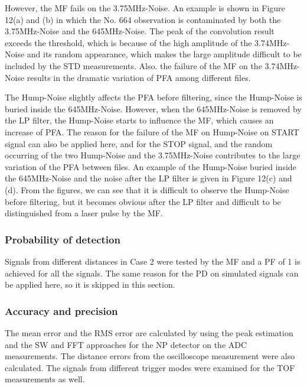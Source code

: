 However, the MF fails on the 3.75MHz-Noise. An example is shown in Figure 12(a) and (b) in which the No. 664 observation is contaminated by both the 3.75MHz-Noise and the 645MHz-Noise. The peak of the convolution result exceeds the threshold, which is because of the high amplitude of the 3.74MHz-Noise and its random appearance, which makes the large amplitude difficult to be included by the STD measurements. Also. the failure of the MF on the 3.74MHz-Noise results in the dramatic variation of PFA among different files.\par
The Hump-Noise slightly affects the PFA before filtering, since the Hump-Noise is buried inside the 645MHz-Noise. However, when the 645MHz-Noise is removed by the LP filter, the Hump-Noise starts to influence the MF, which causes an increase of PFA. The reason for the failure of the MF on Hump-Noise on START signal can also be applied here, and for the STOP signal, and the random occurring of the two Hump-Noise and the 3.75MHz-Noise contributes to the large variation of the PFA between files. An example of the Hump-Noise buried inside the 645MHz-Noise and the noise after the LP filter is given in Figure 12(c) and (d). From the figures, we can see that it is difficult to observe the Hump-Noise before filtering, but it becomes obvious after the LP filter and difficult to be distinguished from a laser pulse by the MF. 
\subsubsection{Probability of detection}
Signals from different distances in Case 2 were tested by the MF and a PF of 1 is achieved for all the signals. The same reason for the PD on simulated signals can be applied here, so it is skipped in this section.
\subsubsection{Accuracy and precision}
The mean error and the RMS error are calculated by using the peak estimation and the SW and FFT approaches for the NP detector on the ADC measurements. The distance errors from the oscilloscope measurement were also calculated. The signals from different trigger modes were examined for the TOF measurements as well.\par
